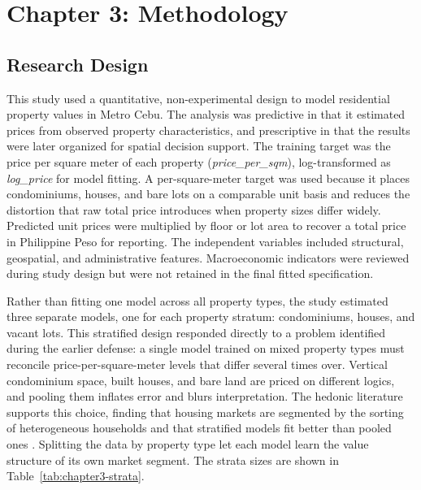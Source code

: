 \section{Chapter 3: Methodology}\label{methodology}

\subsection{Research Design}\label{research-design}

This study used a quantitative, non-experimental design to model residential property values in Metro Cebu. The analysis was predictive in that it estimated prices from observed property characteristics, and prescriptive in that the results were later organized for spatial decision support. The training target was the price per square meter of each property (\emph{price\_per\_sqm}), log-transformed as \emph{log\_price} for model fitting. A per-square-meter target was used because it places condominiums, houses, and bare lots on a comparable unit basis and reduces the distortion that raw total price introduces when property sizes differ widely. Predicted unit prices were multiplied by floor or lot area to recover a total price in Philippine Peso for reporting. The independent variables included structural, geospatial, and administrative features. Macroeconomic indicators were reviewed during study design but were not retained in the final fitted specification.

Rather than fitting one model across all property types, the study estimated three separate models, one for each property stratum: condominiums, houses, and vacant lots. This stratified design responded directly to a problem identified during the earlier defense: a single model trained on mixed property types must reconcile price-per-square-meter levels that differ several times over. Vertical condominium space, built houses, and bare land are priced on different logics, and pooling them inflates error and blurs interpretation. The hedonic literature supports this choice, finding that housing markets are segmented by the sorting of heterogeneous households and that stratified models fit better than pooled ones \parencite{droes2019,usman2020}. Splitting the data by property type let each model learn the value structure of its own market segment. The strata sizes are shown in Table~\ref{tab:chapter3-strata}.

